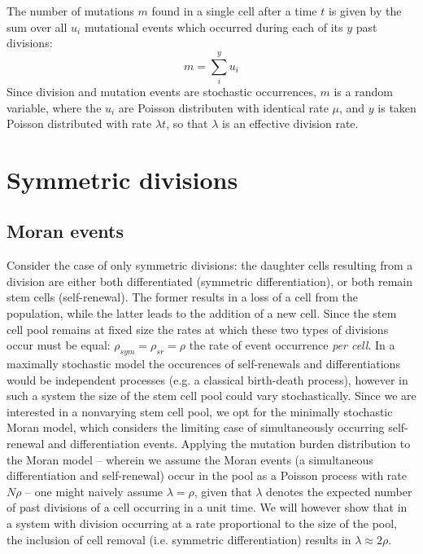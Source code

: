 \documentclass[pdftex,12pt,a4paper]{scrartcl}
\begin{document}
The number of mutations $m$ found in a single cell after a time $t$ is given by the sum over all $u_i$ mutational events which occurred during each of its $y$ past divisions:
\begin{equation}
    m = \sum_i^{y} u_i
\end{equation}
Since division and mutation events are stochastic occurrences, $m$ is a random variable,
where the $u_i$ are Poisson distributen with identical rate $\mu$, and $y$ is taken Poisson distributed with rate $\lambda t$, so that $\lambda$ is an effective division rate.

\section{Symmetric divisions}

\subsection{Moran events}
Consider the case of only symmetric divisions: the daughter cells resulting from a division are either both differentiated (symmetric differentiation), or both remain stem cells (self-renewal). The former results in a loss of a cell from the population, while the latter leads to the addition of a new cell. Since the stem cell pool remains at fixed size the rates at which these two types of divisions occur must be equal: $\rho_{sym} = \rho_{sr} = \rho$ the rate of event occurrence \textit{per cell}. In a maximally stochastic model the occurences of self-renewals and differentiations would be independent processes (e.g. a classical birth-death process), however in such a system the size of the stem cell pool could vary stochastically. Since we are interested in a nonvarying stem cell pool, we opt for the minimally stochastic Moran model, which considers the limiting case of simultaneously occurring self-renewal and differentiation events. Applying the mutation burden distribution to the Moran model -- wherein we assume the Moran events (a simultaneous differentiation and self-renewal) occur in the pool as a Poisson process with rate $N\rho$ -- one might naively assume $\lambda = \rho$, given that $\lambda$ denotes the expected number of past divisions of a cell occurring in a unit time. We will however show that in a system with division occurring at a rate proportional to the size of the pool, the inclusion of cell removal (i.e. symmetric differentiation) results in $\lambda \approx 2\rho$.
\end{document}
